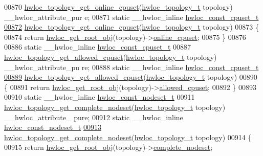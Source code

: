 \begin{DoxyCode}
00870 \hyperlink{a00060_gafeb07985e2cc66aee1da447aff0bcab8}{hwloc_topology_get_online_cpuset}(\hyperlink{a00039_ga9d1e76ee15a7dee158b786c30b6a6e38}{hwloc_topology_t} topology) \_\_hwloc\_attribute\_pur
      e;
00871 \textcolor{keyword}{static} \_\_hwloc\_inline \hyperlink{a00040_ga1f784433e9b606261f62d1134f6a3b25}{hwloc_const_cpuset_t}
\hypertarget{a00031_source_l00872}{}\hyperlink{a00060_gafeb07985e2cc66aee1da447aff0bcab8}{00872} \hyperlink{a00060_gafeb07985e2cc66aee1da447aff0bcab8}{hwloc_topology_get_online_cpuset}(\hyperlink{a00039_ga9d1e76ee15a7dee158b786c30b6a6e38}{hwloc_topology_t} topology)
00873 \{
00874   \textcolor{keywordflow}{return} \hyperlink{a00053_gadbf58f6e187efbdb3cd9a8e30311b7d7}{hwloc_get_root_obj}(topology)->\hyperlink{a00016_a8842d56c2975380f327ea401c5f53564}{online_cpuset};
00875 \}
00876 
00886 \textcolor{keyword}{static} \_\_hwloc\_inline \hyperlink{a00040_ga1f784433e9b606261f62d1134f6a3b25}{hwloc_const_cpuset_t}
00887 \hyperlink{a00060_ga08e3b14e1fe7642b383633d34c1f3c4a}{hwloc_topology_get_allowed_cpuset}(\hyperlink{a00039_ga9d1e76ee15a7dee158b786c30b6a6e38}{hwloc_topology_t} topology) \_\_hwloc\_attribute\_pu
      re;
00888 \textcolor{keyword}{static} \_\_hwloc\_inline \hyperlink{a00040_ga1f784433e9b606261f62d1134f6a3b25}{hwloc_const_cpuset_t}
\hypertarget{a00031_source_l00889}{}\hyperlink{a00060_ga08e3b14e1fe7642b383633d34c1f3c4a}{00889} \hyperlink{a00060_ga08e3b14e1fe7642b383633d34c1f3c4a}{hwloc_topology_get_allowed_cpuset}(\hyperlink{a00039_ga9d1e76ee15a7dee158b786c30b6a6e38}{hwloc_topology_t} topology)
00890 \{
00891   \textcolor{keywordflow}{return} \hyperlink{a00053_gadbf58f6e187efbdb3cd9a8e30311b7d7}{hwloc_get_root_obj}(topology)->\hyperlink{a00016_afa3c59a6dd3da8ffa48710780a1bfb34}{allowed_cpuset};
00892 \}
00893 
00910 \textcolor{keyword}{static} \_\_hwloc\_inline \hyperlink{a00040_ga2f5276235841ad66a79bedad16a5a10c}{hwloc_const_nodeset_t}
00911 \hyperlink{a00061_gaddb7a1f3d71510bb011189e0b8edf29f}{hwloc_topology_get_complete_nodeset}(\hyperlink{a00039_ga9d1e76ee15a7dee158b786c30b6a6e38}{hwloc_topology_t} topology) \_\_hwloc\_attribute\_
      pure;
00912 \textcolor{keyword}{static} \_\_hwloc\_inline \hyperlink{a00040_ga2f5276235841ad66a79bedad16a5a10c}{hwloc_const_nodeset_t}
\hypertarget{a00031_source_l00913}{}\hyperlink{a00061_gaddb7a1f3d71510bb011189e0b8edf29f}{00913} \hyperlink{a00061_gaddb7a1f3d71510bb011189e0b8edf29f}{hwloc_topology_get_complete_nodeset}(\hyperlink{a00039_ga9d1e76ee15a7dee158b786c30b6a6e38}{hwloc_topology_t} topology)
00914 \{
00915   \textcolor{keywordflow}{return} \hyperlink{a00053_gadbf58f6e187efbdb3cd9a8e30311b7d7}{hwloc_get_root_obj}(topology)->\hyperlink{a00016_ac38c4012127525ef74c5615c526f4c2e}{complete_nodeset};

\end{DoxyCode}
